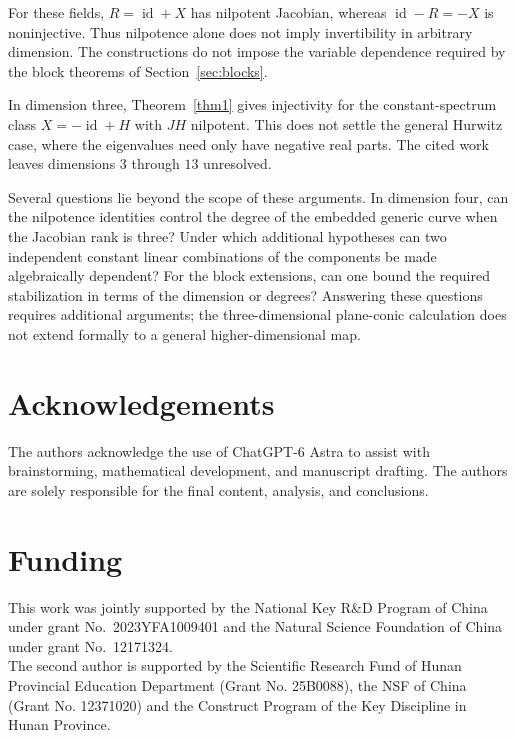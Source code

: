 \documentclass[11pt,reqno]{amsart}
\theoremstyle{definition}
\theoremstyle{remark}
\numberwithin{equation}{section}
\DeclareMathOperator{\id}{id}
\begin{document}
For these fields, $R=\id+X$ has nilpotent Jacobian, whereas $\id-R=-X$ is noninjective. Thus nilpotence alone does not imply invertibility in arbitrary dimension. The constructions do not impose the variable dependence required by the block theorems of Section~\ref{sec:blocks}.

In dimension three, Theorem~\ref{thm1} gives injectivity for the constant-spectrum class $X=-\id+H$ with $JH$ nilpotent. This does not settle the general Hurwitz case, where the eigenvalues need only have negative real parts. The cited work leaves dimensions $3$ through $13$ unresolved.

Several questions lie beyond the scope of these arguments. In dimension four, can the nilpotence identities control the degree of the embedded generic curve when the Jacobian rank is three? Under which additional hypotheses can two independent constant linear combinations of the components be made algebraically dependent? For the block extensions, can one bound the required stabilization in terms of the dimension or degrees? Answering these questions requires additional arguments; the three-dimensional plane-conic calculation does not extend formally to a general higher-dimensional map.


\section*{Acknowledgements}
The authors acknowledge the use of ChatGPT-6 Astra to assist with brainstorming, mathematical development, and manuscript drafting. The authors are solely responsible for the final content, analysis, and conclusions.

\section*{Funding}
This work was jointly supported by the National Key R\&D Program of China under grant No.~2023YFA1009401 and the Natural Science Foundation of China under grant No.~12171324.\\ 

The second author is supported by the Scientific Research Fund of Hunan Provincial Education Department (Grant No. 25B0088), the NSF of China (Grant No. 12371020) and the Construct Program of the Key Discipline in Hunan Province.



\end{document}
